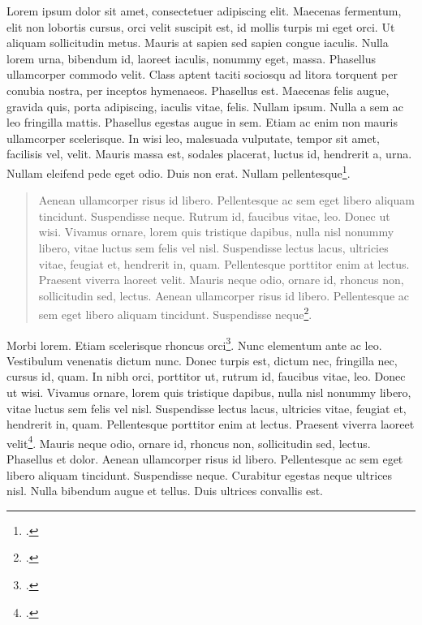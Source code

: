 Lorem ipsum dolor sit amet, consectetuer adipiscing elit. Maecenas fermentum, elit non lobortis cursus, orci velit suscipit est, id mollis turpis mi eget orci. Ut aliquam sollicitudin metus. Mauris at sapien sed sapien congue iaculis. Nulla lorem urna, bibendum id, laoreet iaculis, nonummy eget, massa. Phasellus ullamcorper commodo velit. Class aptent taciti sociosqu ad litora torquent per conubia nostra, per inceptos hymenaeos. Phasellus est. Maecenas felis augue, gravida quis, porta adipiscing, iaculis vitae, felis. Nullam ipsum. Nulla a sem ac leo fringilla mattis. Phasellus egestas augue in sem. Etiam ac enim non mauris ullamcorper scelerisque. In wisi leo, malesuada vulputate, tempor sit amet, facilisis vel, velit. Mauris massa est, sodales placerat, luctus id, hendrerit a, urna. Nullam eleifend pede eget odio. Duis non erat. Nullam pellentesque\footcite[56]{Desfois1998}.


\begin{quote}
Aenean ullamcorper risus id libero. Pellentesque ac sem eget libero aliquam tincidunt. Suspendisse neque. Rutrum id, faucibus vitae, leo. Donec ut wisi. Vivamus ornare, lorem quis tristique dapibus, nulla nisl nonummy libero, vitae luctus sem felis vel nisl. Suspendisse lectus lacus, ultricies vitae, feugiat et, hendrerit in, quam. Pellentesque porttitor enim at lectus. Praesent viverra laoreet velit. Mauris neque odio, ornare id, rhoncus non, sollicitudin sed, lectus. Aenean ullamcorper risus id libero. Pellentesque ac sem eget libero aliquam tincidunt. Suspendisse neque\footcite[voir \pno~154]{Georges1974}.
\end{quote}



Morbi lorem. Etiam scelerisque rhoncus orci\footcite{Georges1974}. Nunc elementum ante ac leo. Vestibulum venenatis dictum nunc. Donec turpis est, dictum nec, fringilla nec, cursus id, quam. In nibh orci, porttitor ut, rutrum id, faucibus vitae, leo. Donec ut wisi. Vivamus ornare, lorem quis tristique dapibus, nulla nisl nonummy libero, vitae luctus sem felis vel nisl. Suspendisse lectus lacus, ultricies vitae, feugiat et, hendrerit in, quam. Pellentesque porttitor enim at lectus. Praesent viverra laoreet velit\footcite[56]{Desfois1998}. Mauris neque odio, ornare id, rhoncus non, sollicitudin sed, lectus. Phasellus et dolor. Aenean ullamcorper risus id libero. Pellentesque ac sem eget libero aliquam tincidunt. Suspendisse neque. Curabitur egestas neque ultrices nisl. Nulla bibendum augue et tellus. Duis ultrices convallis est.



